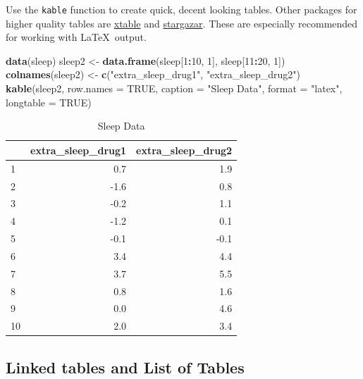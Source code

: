 \documentclass[12pt,oneside]{chicagocapstone}
\newenvironment{Shaded}{\begin{snugshade}}{\end{snugshade}}
\newcommand{\KeywordTok}[1]{\textcolor[rgb]{0.13,0.29,0.53}{\textbf{#1}}}
\newcommand{\DataTypeTok}[1]{\textcolor[rgb]{0.13,0.29,0.53}{#1}}
\newcommand{\DecValTok}[1]{\textcolor[rgb]{0.00,0.00,0.81}{#1}}
\newcommand{\StringTok}[1]{\textcolor[rgb]{0.31,0.60,0.02}{#1}}
\newcommand{\OtherTok}[1]{\textcolor[rgb]{0.56,0.35,0.01}{#1}}
\newcommand{\OperatorTok}[1]{\textcolor[rgb]{0.81,0.36,0.00}{\textbf{#1}}}
\newcommand{\NormalTok}[1]{#1}
\begin{document}
Use the \texttt{kable} function to create quick, decent looking tables.
Other packages for higher quality tables are
\href{https://cran.r-project.org/web/packages/xtable/index.html}{xtable}
and
\href{https://cran.r-project.org/web/packages/stargazer/index.html}{stargazar}.
These are especially recommended for working with \LaTeX~output.
\begin{Shaded}
\begin{Highlighting}[]
\KeywordTok{data}\NormalTok{(sleep)}
\NormalTok{sleep2 <-}\StringTok{ }\KeywordTok{data.frame}\NormalTok{(sleep[}\DecValTok{1}\OperatorTok{:}\DecValTok{10}\NormalTok{, }\DecValTok{1}\NormalTok{], sleep[}\DecValTok{11}\OperatorTok{:}\DecValTok{20}\NormalTok{, }\DecValTok{1}\NormalTok{])}
\KeywordTok{colnames}\NormalTok{(sleep2) <-}\StringTok{ }\KeywordTok{c}\NormalTok{(}\StringTok{"extra_sleep_drug1"}\NormalTok{, }\StringTok{"extra_sleep_drug2"}\NormalTok{)}
\KeywordTok{kable}\NormalTok{(sleep2, }\DataTypeTok{row.names =} \OtherTok{TRUE}\NormalTok{, }\DataTypeTok{caption =} \StringTok{"Sleep Data"}\NormalTok{, }
              \DataTypeTok{format =} \StringTok{"latex"}\NormalTok{, }\DataTypeTok{longtable =} \OtherTok{TRUE}\NormalTok{)}
\end{Highlighting}
\end{Shaded}
\begin{longtable}{l|r|r}
\caption{\label{tab:sleep}Sleep Data}\\
\hline
  & extra\_sleep\_drug1 & extra\_sleep\_drug2\\
\hline
1 & 0.7 & 1.9\\
\hline
2 & -1.6 & 0.8\\
\hline
3 & -0.2 & 1.1\\
\hline
4 & -1.2 & 0.1\\
\hline
5 & -0.1 & -0.1\\
\hline
6 & 3.4 & 4.4\\
\hline
7 & 3.7 & 5.5\\
\hline
8 & 0.8 & 1.6\\
\hline
9 & 0.0 & 4.6\\
\hline
10 & 2.0 & 3.4\\
\hline
\end{longtable}
\subsection*{Linked tables and List of
Tables}\label{linked-tables-and-list-of-tables}
\end{document}
